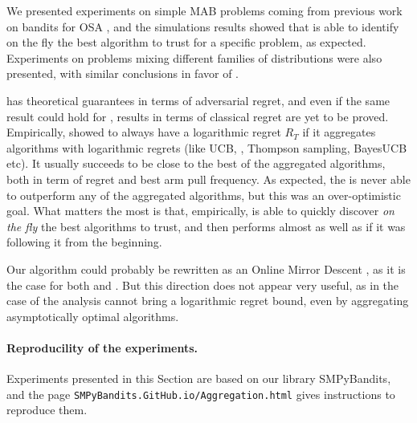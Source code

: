 We presented experiments on simple MAB problems coming from previous work on bandits for OSA \cite{Jouini10},
and the simulations results showed that \Aggr{} is able to identify on the fly the best algorithm to trust for a specific problem, as expected.
Experiments on problems mixing different families of distributions were also presented, with similar conclusions in favor of \Aggr.

\ExpQ{} has theoretical guarantees in terms of adversarial regret, and even if the same result could hold for \Aggr, results in terms of classical regret are yet to be proved.
Empirically, \Aggr{} showed to always have a logarithmic
regret $R_T$ if it aggregates algorithms with logarithmic regrets (like UCB, \klUCB, Thompson sampling, BayesUCB etc).
It usually succeeds to be close to the best of the aggregated algorithms, both in term of regret and best arm pull frequency.
As expected, the \Aggr{} is never able to outperform any of the aggregated algorithms, but this was an over-optimistic goal.
%
What matters the most is that, empirically, \Aggr{} is able to quickly discover \emph{on the fly} the best algorithms to trust, and then performs almost as well as if it was following it from the beginning.

Our \Aggr{} algorithm could probably be rewritten as an Online Mirror Descent \cite{Hazan2016introduction,Zimmert2018}, as it is the case for both \ExpQ{} and \CORRAL.
But this direction does not appear very useful, as in the case of \CORRAL{}  the analysis cannot bring a logarithmic regret bound, even by aggregating asymptotically optimal algorithms.

\paragraph{Reproducility of the experiments.}
%
Experiments presented in this Section are based on our library SMPyBandits,
and the page \texttt{SMPyBandits.GitHub.io/Aggregation.html} gives instructions to reproduce them.


% 
% 
